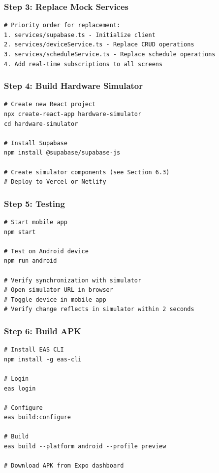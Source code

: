 \documentclass[12pt,a4paper]{article}
\begin{document}
\subsubsection{Step 3: Replace Mock Services}
\begin{verbatim}
# Priority order for replacement:
1. services/supabase.ts - Initialize client
2. services/deviceService.ts - Replace CRUD operations
3. services/scheduleService.ts - Replace schedule operations
4. Add real-time subscriptions to all screens
\end{verbatim}

\subsubsection{Step 4: Build Hardware Simulator}
\begin{verbatim}
# Create new React project
npx create-react-app hardware-simulator
cd hardware-simulator

# Install Supabase
npm install @supabase/supabase-js

# Create simulator components (see Section 6.3)
# Deploy to Vercel or Netlify
\end{verbatim}

\subsubsection{Step 5: Testing}
\begin{verbatim}
# Start mobile app
npm start

# Test on Android device
npm run android

# Verify synchronization with simulator
# Open simulator URL in browser
# Toggle device in mobile app
# Verify change reflects in simulator within 2 seconds
\end{verbatim}

\subsubsection{Step 6: Build APK}
\begin{verbatim}
# Install EAS CLI
npm install -g eas-cli

# Login
eas login

# Configure
eas build:configure

# Build
eas build --platform android --profile preview

# Download APK from Expo dashboard
\end{verbatim}
\end{document}
